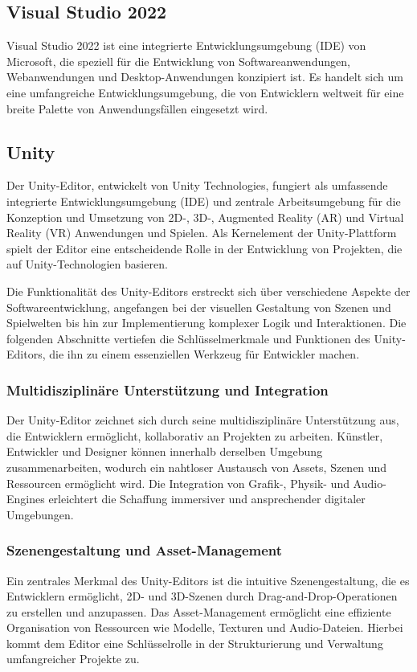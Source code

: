 \subsection{Visual Studio 2022}
Visual Studio 2022 ist eine integrierte Entwicklungsumgebung (IDE) von Microsoft, die speziell für die Entwicklung von
Softwareanwendungen, Webanwendungen und Desktop-Anwendungen konzipiert ist. Es handelt sich um eine umfangreiche
Entwicklungsumgebung, die von Entwicklern weltweit für eine breite Palette von Anwendungsfällen eingesetzt wird.

\subsection{Unity}
Der Unity-Editor, entwickelt von Unity Technologies, fungiert als umfassende integrierte Entwicklungsumgebung (IDE)
und zentrale Arbeitsumgebung für die Konzeption und Umsetzung von 2D-, 3D-, Augmented Reality (AR) und Virtual Reality
(VR) Anwendungen und Spielen. Als Kernelement der Unity-Plattform spielt der Editor eine entscheidende Rolle in der
Entwicklung von Projekten, die auf Unity-Technologien basieren.

Die Funktionalität des Unity-Editors erstreckt sich über verschiedene Aspekte der Softwareentwicklung, angefangen bei
der visuellen Gestaltung von Szenen und Spielwelten bis hin zur Implementierung komplexer Logik und Interaktionen. Die
folgenden Abschnitte vertiefen die Schlüsselmerkmale und Funktionen des Unity-Editors, die ihn zu einem essenziellen
Werkzeug für Entwickler machen.

\subsubsection{Multidisziplinäre Unterstützung und Integration}
Der Unity-Editor zeichnet sich durch seine multidisziplinäre Unterstützung aus, die Entwicklern ermöglicht, kollaborativ
an Projekten zu arbeiten. Künstler, Entwickler und Designer können innerhalb derselben Umgebung zusammenarbeiten,
wodurch ein nahtloser Austausch von Assets, Szenen und Ressourcen ermöglicht wird. Die Integration von Grafik-,
Physik- und Audio-Engines erleichtert die Schaffung immersiver und ansprechender digitaler Umgebungen.

\subsubsection{Szenengestaltung und Asset-Management}
Ein zentrales Merkmal des Unity-Editors ist die intuitive Szenengestaltung, die es Entwicklern ermöglicht,
2D- und 3D-Szenen durch Drag-and-Drop-Operationen zu erstellen und anzupassen. Das Asset-Management ermöglicht eine
effiziente Organisation von Ressourcen wie Modelle, Texturen und Audio-Dateien. Hierbei kommt dem Editor eine
Schlüsselrolle in der Strukturierung und Verwaltung umfangreicher Projekte zu.

